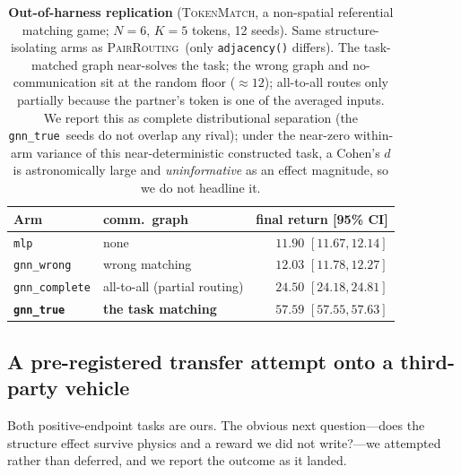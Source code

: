 \documentclass[10pt]{article}
\newcommand{\gtrue}{\texttt{gnn\_true}}
\newcommand{\gwrong}{\texttt{gnn\_wrong}}
\newcommand{\gcomplete}{\texttt{gnn\_complete}}
\newcommand{\mlpc}{\texttt{mlp}}
\newcommand{\pairrouting}{\textsc{PairRouting}}
\newcommand{\tokenmatch}{\textsc{TokenMatch}}
\newcommand{\TMfloor}{12}             %
\newcommand{\TMmlp}{11.90}            %
\newcommand{\TMmlpLo}{11.67}
\newcommand{\TMmlpHi}{12.14}
\newcommand{\TMwrong}{12.03}          %
\newcommand{\TMwrongLo}{11.78}
\newcommand{\TMwrongHi}{12.27}
\newcommand{\TMcomplete}{24.50}       %
\newcommand{\TMcompleteLo}{24.18}
\newcommand{\TMcompleteHi}{24.81}
\newcommand{\TMtrue}{57.59}           %
\newcommand{\TMtrueLo}{57.55}
\newcommand{\TMtrueHi}{57.63}
\begin{document}
\begin{table}[t]
  \centering
  \small
  \caption{\textbf{Out-of-harness replication} (\tokenmatch, a non-spatial
  referential matching game; $N{=}6$, $K{=}5$ tokens, 12 seeds). Same
  structure-isolating arms as \pairrouting\ (only \texttt{adjacency()}
  differs). The task-matched graph near-solves the task; the wrong graph and
  no-communication sit at the random floor (${\approx}\TMfloor$); all-to-all
  routes only partially because the partner's token is one of the averaged
  inputs. We report this as complete distributional separation (the \gtrue\
  seeds do not overlap any rival); under the near-zero within-arm variance of
  this near-deterministic constructed task, a Cohen's $d$ is astronomically
  large and \emph{uninformative} as an effect magnitude, so we do not headline
  it.}
  \label{tab:tokenmatch}
  \begin{tabular}{llr}
    \toprule
    Arm & comm.\ graph & final return [95\% CI] \\
    \midrule
    \mlpc      & none                  & $\TMmlp$ $[\TMmlpLo, \TMmlpHi]$ \\
    \gwrong    & wrong matching        & $\TMwrong$ $[\TMwrongLo, \TMwrongHi]$ \\
    \gcomplete & all-to-all (partial routing) & $\TMcomplete$ $[\TMcompleteLo, \TMcompleteHi]$ \\
    \textbf{\gtrue} & \textbf{the task matching} & $\mathbf{\TMtrue}$ $[\TMtrueLo, \TMtrueHi]$ \\
    \bottomrule
  \end{tabular}
\end{table}

\subsection{A pre-registered transfer attempt onto a third-party vehicle}
\label{sec:structure:transfer}

Both positive-endpoint tasks are ours. The obvious next question---does the
structure effect survive physics and a reward we did not write?---we attempted
rather than deferred, and we report the outcome as it landed.
\end{document}
